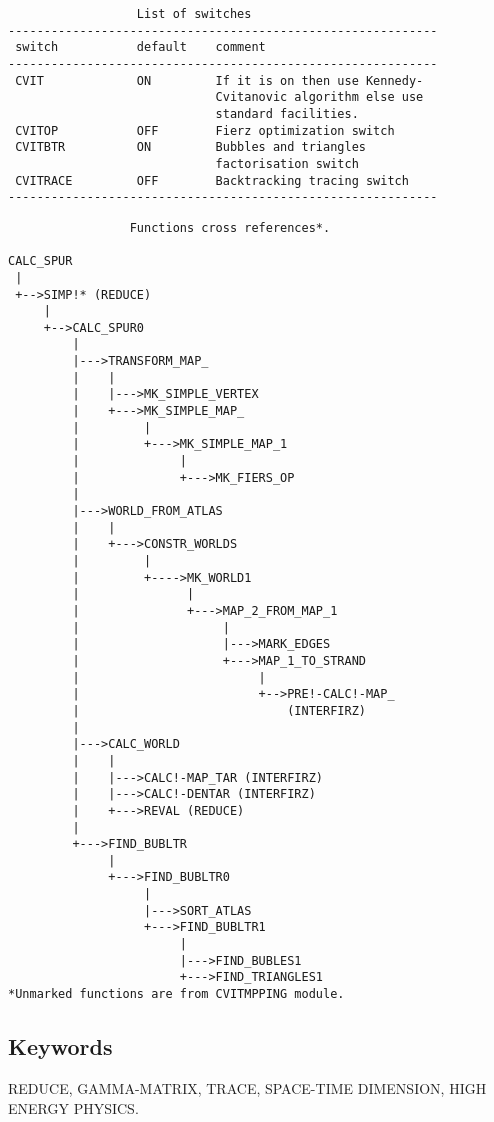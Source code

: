\begin{verbatim}
                  List of switches
------------------------------------------------------------
 switch           default    comment
------------------------------------------------------------
 CVIT             ON         If it is on then use Kennedy-
                             Cvitanovic algorithm else use
                             standard facilities.
 CVITOP           OFF        Fierz optimization switch
 CVITBTR          ON         Bubbles and triangles
                             factorisation switch
 CVITRACE         OFF        Backtracking tracing switch
------------------------------------------------------------
\end{verbatim}


\begin{verbatim}
                 Functions cross references*.

CALC_SPUR
 |
 +-->SIMP!* (REDUCE)
     |
     +-->CALC_SPUR0
         |
         |--->TRANSFORM_MAP_
         |    |
         |    |--->MK_SIMPLE_VERTEX
         |    +--->MK_SIMPLE_MAP_
         |         |
         |         +--->MK_SIMPLE_MAP_1
         |              |
         |              +--->MK_FIERS_OP
         |
         |--->WORLD_FROM_ATLAS
         |    |
         |    +--->CONSTR_WORLDS
         |         |
         |         +---->MK_WORLD1
         |               |
         |               +--->MAP_2_FROM_MAP_1
         |                    |
         |                    |--->MARK_EDGES
         |                    +--->MAP_1_TO_STRAND
         |                         |
         |                         +-->PRE!-CALC!-MAP_
         |                             (INTERFIRZ)
         |
         |--->CALC_WORLD
         |    |
         |    |--->CALC!-MAP_TAR (INTERFIRZ)
         |    |--->CALC!-DENTAR (INTERFIRZ)
         |    +--->REVAL (REDUCE)
         |
         +--->FIND_BUBLTR
              |
              +--->FIND_BUBLTR0
                   |
                   |--->SORT_ATLAS
                   +--->FIND_BUBLTR1
                        |
                        |--->FIND_BUBLES1
                        +--->FIND_TRIANGLES1
*Unmarked functions are from CVITMPPING module.

\end{verbatim}

\subsection*{Keywords}

REDUCE, GAMMA-MATRIX,  TRACE, SPACE-TIME  DIMENSION, HIGH  ENERGY PHYSICS.
